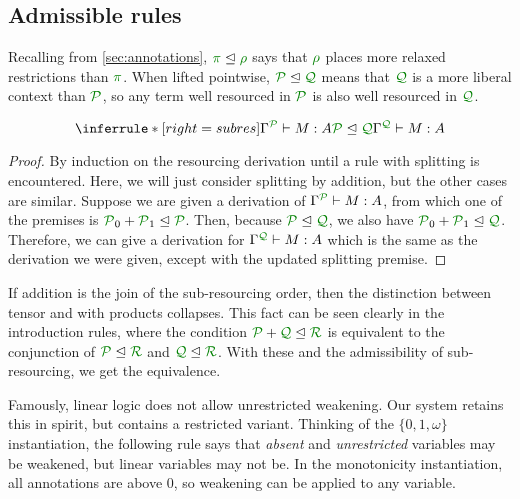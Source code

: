 \subsection{Admissible rules}
\label{sec:admissible}


Recalling from \autoref{sec:annotations}, $\rescomment \pi \subres \rescomment
\rho$ says that $\rescomment \rho$ places more relaxed restrictions than
$\rescomment \pi$.
When lifted pointwise, $\resctx P \subres \resctx Q$ means that
$\resctx Q$ is a more liberal context than $\resctx
 P$, so any term well resourced in $\resctx P$ is also well
resourced in $\resctx Q$.

\begin{lemma}
  \label{lem:subres}
  \[
    \inferrule*[right=subres]{
      \ctx{\Gamma}{P} \vdash M : A
      \\ \resctx P \subres \resctx Q
    }
    {
      \ctx{\Gamma}{Q} \vdash M : A
    }
  \]
\end{lemma}
\begin{proof}
  By induction on the resourcing derivation until a rule with splitting is
  encountered.
  Here, we will just consider splitting by addition, but the other cases are
  similar.
  Suppose we are given a derivation of $\ctx{\Gamma}{P} \vdash M : A$,
  from which one of the premises is
  $\resctx P_0 + \resctx P_1 \subres \resctx P$.
  Then, because $\resctx P \subres \resctx Q$, we also have
  $\resctx P_0 + \resctx P_1 \subres \resctx Q$.
  Therefore, we can give a derivation for
  $\ctx{\Gamma}{Q} \vdash M : A$ which is the same as the derivation we
  were given, except with the updated splitting premise.
\end{proof}

If addition is the join of the sub-resourcing order, then the distinction
between tensor and with products collapses.
This fact can be seen clearly in the introduction rules, where the condition
$\resctx P + \resctx Q \subres \resctx R$ is equivalent to the conjunction of
$\resctx P \subres \resctx R$ and $\resctx Q \subres \resctx R$.
With these and the admissibility of sub-resourcing, we get the equivalence.

Famously, linear logic does not allow unrestricted weakening.
Our system retains this in spirit, but contains a restricted variant.
Thinking of the $\{0,1,\omega\}$ instantiation, the following rule says that
\emph{absent} and \emph{unrestricted} variables may be weakened, but linear
variables may not be.
In the monotonicity instantiation, all annotations are above $0$, so weakening
can be applied to any variable.

